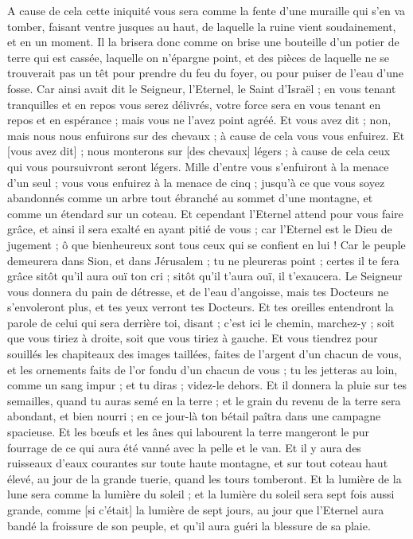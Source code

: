 \begin{multicols}{2}
A cause de cela cette iniquité vous sera comme la fente d'une muraille qui s'en va tomber, faisant ventre jusques au haut, de laquelle la ruine vient soudainement, et en un moment.
Il la brisera donc comme on brise une bouteille d'un potier de terre qui est cassée, laquelle on n'épargne point, et des pièces de laquelle ne se trouverait pas un têt pour prendre du feu du foyer, ou pour puiser de l'eau d'une fosse.
Car ainsi avait dit le Seigneur, l'Eternel, le Saint d'Israël ; en vous tenant tranquilles et en repos vous serez délivrés, votre force sera en vous tenant en repos et en espérance ; mais vous ne l'avez point agréé.
Et vous avez dit ; non, mais nous nous enfuirons sur des chevaux ; à cause de cela vous vous enfuirez. Et [vous avez dit] ; nous monterons sur [des chevaux] légers ; à cause de cela ceux qui vous poursuivront seront légers.
Mille d'entre vous s'enfuiront à la menace d'un seul ; vous vous enfuirez à la menace de cinq ; jusqu'à ce que vous soyez abandonnés comme un arbre tout ébranché au sommet d'une montagne, et comme un étendard sur un coteau.
Et cependant l'Eternel attend pour vous faire grâce, et ainsi il sera exalté en ayant pitié de vous ; car l'Eternel est le Dieu de jugement ; ô que bienheureux sont tous ceux qui se confient en lui !
Car le peuple demeurera dans Sion, et dans Jérusalem ; tu ne pleureras point ; certes il te fera grâce sitôt qu'il aura ouï ton cri ; sitôt qu'il t'aura ouï, il t'exaucera.
Le Seigneur vous donnera du pain de détresse, et de l'eau d'angoisse, mais tes Docteurs ne s'envoleront plus, et tes yeux verront tes Docteurs.
Et tes oreilles entendront la parole de celui qui sera derrière toi, disant ; c'est ici le chemin, marchez-y ; soit que vous tiriez à droite, soit que vous tiriez à gauche.
Et vous tiendrez pour souillés les chapiteaux des images taillées, faites de l'argent d'un chacun de vous, et les ornements faits de l'or fondu d'un chacun de vous ; tu les jetteras au loin, comme un sang impur ; et tu diras ; videz-le dehors.
Et il donnera la pluie sur tes semailles, quand tu auras semé en la terre ; et le grain du revenu de la terre sera abondant, et bien nourri ; en ce jour-là ton bétail paîtra dans une campagne spacieuse.
Et les bœufs et les ânes qui labourent la terre mangeront le pur fourrage de ce qui aura été vanné avec la pelle et le van.
Et il y aura des ruisseaux d'eaux courantes sur toute haute montagne, et sur tout coteau haut élevé, au jour de la grande tuerie, quand les tours tomberont.
Et la lumière de la lune sera comme la lumière du soleil ; et la lumière du soleil sera sept fois aussi grande, comme [si c'était] la lumière de sept jours, au jour que l'Eternel aura bandé la froissure de son peuple, et qu'il aura guéri la blessure de sa plaie.

\end{multicols}
